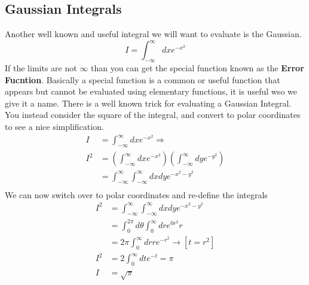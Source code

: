 \documentclass{article}
\newcommand{\be}{\begin{equation}}
\newcommand{\ee}{\end{equation}}
\begin{document}
\subsection*{Gaussian Integrals}
Another well known and useful integral we will want to evaluate is the Gaussian.
\be
I = \int_{-\infty}^\infty dx e^{-x^2}
\ee
If the limits are not $\infty$ than you can get the special function known as the \textbf{Error Fucntion}.
Basically a special function is a common or useful function that appears but cannot be evaluated using elementary functions, it is useful wso we give it a name.
There is a well known trick for evaluating a Gaussian Integral.
You instead consider the square of the integral, and convert to polar coordinates to see a nice simplification.
\be
\begin{split}
	I &= \int_{-\infty}^\infty dx e^{-x^2} \Rightarrow \\
	I^2 &= \left(\int_{-\infty}^\infty dx e^{-x^2}\right) \left(\int_{-\infty}^\infty dy e^{-y^2}\right) \\
	 &= \int_{-\infty}^\infty \int_{-\infty}^\infty dxdy e^{-x^2 - y^2} \\
\end{split}
\ee
We can now switch over to polar coordinates and re-define the integrals
\be
\begin{split}
	 I^2 &= \int_{-\infty}^\infty \int_{-\infty}^\infty dxdy e^{-x^2 - y^2} \\
	 &= \int_0^{2\pi} d\theta \int_0^\infty dr e^{0r^2}r \\
	 &= 2\pi \int_0^\infty dr re^{-r^2} \rightarrow[t=r^2]\\
	 I^2&= 2 \int_0^\infty dt e^{-t} = \pi \\
	 I &= \sqrt{\pi}
\end{split}
\ee
\end{document}
